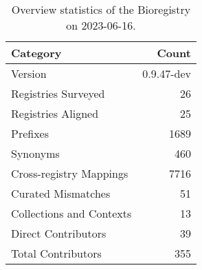 \begin{table}
\caption{Overview statistics of the Bioregistry on 2023-06-16.}
\label{tab:bioregistry-summary}
\begin{tabular}{lr}
\toprule
Category & Count \\
\midrule
Version & 0.9.47-dev \\
Registries Surveyed & 26 \\
Registries Aligned & 25 \\
Prefixes & 1689 \\
Synonyms & 460 \\
Cross-registry Mappings & 7716 \\
Curated Mismatches & 51 \\
Collections and Contexts & 13 \\
Direct Contributors & 39 \\
Total Contributors & 355 \\
\bottomrule
\end{tabular}
\end{table}
